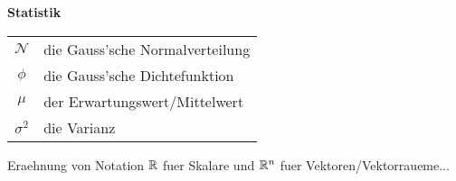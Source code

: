 \begin{center}\textbf{Statistik}\end{center}
\begin{tabular}{cl}
  $\mathcal{N}$ & die Gauss'sche Normalverteilung \\
  $\phi$ & die Gauss'sche Dichtefunktion \\
  $\mu$ & der Erwartungswert/Mittelwert \\
  $\sigma^2$ & die Varianz
\end{tabular}

Eraehnung von Notation $\mathbb{R}$ fuer Skalare und $\mathbb{R}^n$ fuer Vektoren/Vektorraueme...


